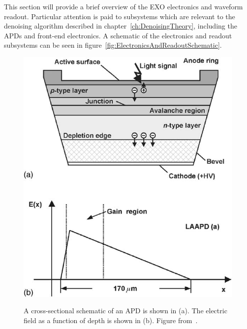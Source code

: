 This section will provide a brief overview of the EXO electronics and waveform readout.  Particular attention is paid to subsystems which are relevant to the denoising algorithm described in chapter~\ref{ch:DenoisingTheory}, including the APDs and front-end electronics.  A schematic of the electronics and readout subsystems can be seen in figure~\ref{fig:ElectronicsAndReadoutSchematic}.

\begin{figure}
\begin{center}
\includegraphics[keepaspectratio=true,width=\textwidth]{APDCrossSection.png}
\end{center}
\renewcommand{\baselinestretch}{1}
\small\normalsize
\begin{quote}
\caption{A cross-sectional schematic of an APD is shown in (a).  The electric field as a function of depth is shown in (b).  Figure from~\cite{Moszynski2002504}.}
\label{fig:APDCrossSection}
\end{quote}
\end{figure}
\renewcommand{\baselinestretch}{2}
\small\normalsize

